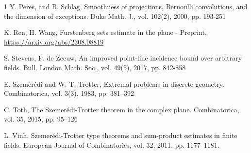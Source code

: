 \documentclass{amsart}
\begin{document}
\begin{thebibliography}{1}
Y. Peres, and B. Schlag,
Smoothness of projections, Bernoulli convolutions, and the dimension of exceptions. Duke Math. J., vol. 102(2), 2000, pp. 193-251

K. Ren, H. Wang,
Furstenberg sets estimate in the plane - Preprint, \url{https://arxiv.org/abs/2308.08819}

S. Stevens, F. de Zeeuw,
An improved point-line incidence bound over arbitrary fields. Bull. London Math. Soc., vol. 49(5), 2017, pp. 842-858

E. Szemerédi and W. T. Trotter,
Extremal problems in discrete geometry.
Combinatorica, vol. 3(3), 1983, pp. 381–392

C. Toth,
The Szemerédi-Trotter theorem in the complex plane. Combinatorica, vol. 35, 2015, pp. 95–126

L. Vinh,
Szemerédi-Trotter type theorems and sum-product estimates in finite fields. European Journal of Combinatorics, vol. 32, 2011, pp. 1177–1181.

\end{thebibliography}
\end{document}
